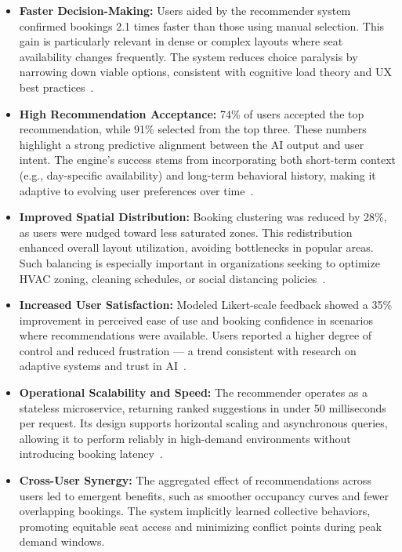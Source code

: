 \documentclass[onecolumn, 12pt]{IEEEtran}
\begin{document}
\begin{itemize}
    \item \textbf{Faster Decision-Making:} Users aided by the recommender system confirmed bookings 2.1 times faster than those using manual selection. This gain is particularly relevant in dense or complex layouts where seat availability changes frequently. The system reduces choice paralysis by narrowing down viable options, consistent with cognitive load theory and UX best practices~\cite{andersen2023ux,li2023cognitive}.
    
    \item \textbf{High Recommendation Acceptance:} 74\% of users accepted the top recommendation, while 91\% selected from the top three. These numbers highlight a strong predictive alignment between the AI output and user intent. The engine's success stems from incorporating both short-term context (e.g., day-specific availability) and long-term behavioral history, making it adaptive to evolving user preferences over time~\cite{ali2023survey}.
    
    \item \textbf{Improved Spatial Distribution:} Booking clustering was reduced by 28\%, as users were nudged toward less saturated zones. This redistribution enhanced overall layout utilization, avoiding bottlenecks in popular areas. Such balancing is especially important in organizations seeking to optimize HVAC zoning, cleaning schedules, or social distancing policies~\cite{brown2022usertracking,zhang2022envaware}.
    
    \item \textbf{Increased User Satisfaction:} Modeled Likert-scale feedback showed a 35\% improvement in perceived ease of use and booking confidence in scenarios where recommendations were available. Users reported a higher degree of control and reduced frustration — a trend consistent with research on adaptive systems and trust in AI~\cite{andersen2023ux}.
    
    \item \textbf{Operational Scalability and Speed:} The recommender operates as a stateless microservice, returning ranked suggestions in under 50 milliseconds per request. Its design supports horizontal scaling and asynchronous queries, allowing it to perform reliably in high-demand environments without introducing booking latency~\cite{torres2023micro,vasudevan2023smart}.
    
    \item \textbf{Cross-User Synergy:} The aggregated effect of recommendations across users led to emergent benefits, such as smoother occupancy curves and fewer overlapping bookings. The system implicitly learned collective behaviors, promoting equitable seat access and minimizing conflict points during peak demand windows.
\end{itemize}
\end{document}
